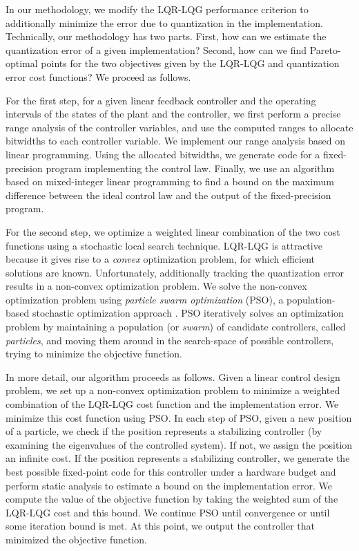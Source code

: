 \documentclass{amsart}
\numberwithin{equation}{section}
\begin{document}
In our methodology, we modify the LQR-LQG performance criterion to additionally minimize 
the error due to quantization in the implementation.
Technically, our methodology has two parts.
First, how can we estimate the quantization error of a given implementation?
Second, how can we find Pareto-optimal points for the two objectives given by the 
LQR-LQG and quantization error cost functions?
We proceed as follows.

For the first step, 
for a given linear feedback controller and the operating intervals of the states of the plant and the controller, 
we first perform a precise range analysis of the controller variables, 
and use the computed ranges to allocate bitwidths to each controller variable. 
We implement our range analysis based on linear programming. 
Using the allocated bitwidths, we generate code for a fixed-precision 
program implementing the control law. 
Finally, we use an algorithm based on mixed-integer linear programming to find 
a bound on the maximum difference 
between the ideal control law and the output of the fixed-precision program.

For the second step, we optimize a weighted linear combination of the two cost functions
using a stochastic local search technique.
LQR-LQG is attractive because it gives rise to a {\em convex} optimization problem,
for which efficient solutions are known.
Unfortunately, additionally tracking the quantization error results in a non-convex
optimization problem.
We solve the non-convex optimization problem using {\em particle swarm optimization} (PSO), a
population-based stochastic optimization approach \cite{kennedy,liu,jiang}. 
PSO iteratively solves an optimization problem by maintaining a population (or {\em swarm}) of candidate controllers, 
called {\em particles}, and moving them around in the search-space of possible
controllers, trying to minimize the objective function.

In more detail, our algorithm proceeds as follows.
Given a linear control design problem, we set up a non-convex optimization problem to minimize a weighted combination
of the LQR-LQG cost function and the implementation error.
We minimize this cost function using PSO.
In each step of PSO, given a new position of a particle, we check if the position represents a stabilizing
controller (by examining the eigenvalues of the controlled system).
If not, we assign the position an infinite cost.
If the position represents a stabilizing controller, we generate the best possible 
fixed-point code for this controller under a hardware budget
and perform static analysis to estimate a bound on the implementation error.
We compute the value of the objective function by taking the weighted sum of the LQR-LQG cost and this bound.
We continue PSO until convergence or until some iteration bound is met.
At this point, we output the controller that minimized the objective function.
\end{document}

